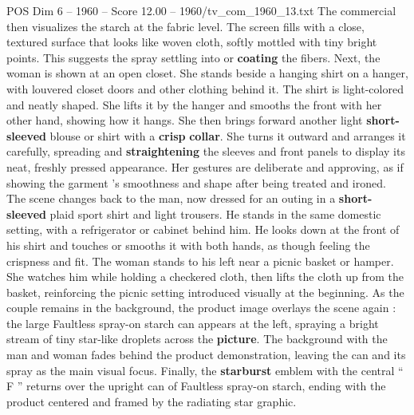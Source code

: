 \begin{textsample}{POS Dim 6 – 1960 – Score 12.00 – 1960/tv\_com\_1960\_13.txt}
The commercial then visualizes the starch at the fabric level.
The screen fills with a close, textured surface that looks like woven cloth, softly mottled with tiny bright points.
This suggests the spray settling into or \textbf{coating} the fibers.
Next, the woman is shown at an open closet.
She stands beside a hanging shirt on a hanger, with louvered closet doors and other clothing behind it.
The shirt is light-colored and neatly shaped.
She lifts it by the hanger and smooths the front with her other hand, showing how it hangs.
She then brings forward another light \textbf{short-sleeved} blouse or shirt with a \textbf{crisp} \textbf{collar}.
She turns it outward and arranges it carefully, spreading and \textbf{straightening} the sleeves and front panels to display its neat, freshly pressed appearance.
Her gestures are deliberate and approving, as if showing the garment ’s smoothness and shape after being treated and ironed.
The scene changes back to the man, now dressed for an outing in a \textbf{short-sleeved} plaid sport shirt and light trousers.
He stands in the same domestic setting, with a refrigerator or cabinet behind him.
He looks down at the front of his shirt and touches or smooths it with both hands, as though feeling the crispness and fit.
The woman stands to his left near a picnic basket or hamper.
She watches him while holding a checkered cloth, then lifts the cloth up from the basket, reinforcing the picnic setting introduced visually at the beginning.
As the couple remains in the background, the product image overlays the scene again : the large Faultless spray-on starch can appears at the left, spraying a bright stream of tiny star-like droplets across the \textbf{picture}.
The background with the man and woman fades behind the product demonstration, leaving the can and its spray as the main visual focus.
Finally, the \textbf{starburst} emblem with the central “ F ” returns over the upright can of Faultless spray-on starch, ending with the product centered and framed by the radiating star graphic.

\end{textsample}
